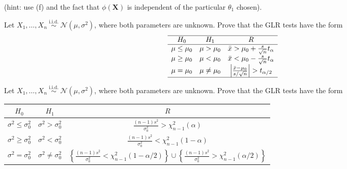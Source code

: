 \begin{ex}
\begin{enumerate}[(a)]
        (hint: use (f) and the fact that \(\phi(\mathbf{X})\) is independent of the particular \(\theta_{1}\) chosen). 
    \end{enumerate}
\end{ex}


\begin{ex}
    Let \(X_{1}, \ldots, X_{n} \stackrel{\text { i.i.d. }}{\sim} \mathcal{N}\left(\mu, \sigma^{2}\right)\), where both parameters are unknown. Prove that the GLR tests have the form
    \[
        \begin{array}{ccc}
        \hline H_{0} & H_{1} & R \\
        \hline \mu \leq \mu_{0} & \mu>\mu_{0} & \bar{x}>\mu_{0}+\frac{s}{\sqrt{n}} t_{\alpha} \\
        \mu \geq \mu_{0} & \mu<\mu_{0} & \bar{x}<\mu_{0}-\frac{s}{\sqrt{n}} t_{\alpha} \\
        \mu=\mu_{0} & \mu \neq \mu_{0} & \left|\frac{\bar{x}-\mu_{0}}{s / \sqrt{n}}\right|>t_{\alpha / 2} \\
        \hline
        \end{array}
    \]
\end{ex}

\begin{ex}
    Let \(X_{1}, \ldots, X_{n} \stackrel{\text { i.i.d. }}{\sim} \mathcal{N}\left(\mu, \sigma^{2}\right)\), where both parameters are unknown. Prove that the GLR tests have the form
    \begin{center}
        \begin{tabular}{ccc}
            \hline\(H_{0}\) & \(H_{1}\) & \(R\) \\
            \hline\(\sigma^{2} \leq \sigma_{0}^{2}\) & \(\sigma^{2}>\sigma_{0}^{2}\) & \(\frac{(n-1) s^{2}}{\sigma_{0}^{2}}>\chi_{n-1}^{2}(\alpha)\) \\
            \(\sigma^{2} \geq \sigma_{0}^{2}\) & \(\sigma^{2}<\sigma_{0}^{2}\) & \(\frac{(n-1) s^{2}}{\sigma_{0}^{2}}<\chi_{n-1}^{2}(1-\alpha)\) \\
            \(\sigma^{2}=\sigma_{0}^{2}\) & \(\sigma^{2} \neq \sigma_{0}^{2}\) & \(\left\{\frac{(n-1) s^{2}}{\sigma_{0}^{2}}<\chi_{n-1}^{2}(1-\alpha / 2)\right\} \cup\left\{\frac{(n-1) s^{2}}{\sigma_{0}^{2}}>\chi_{n-1}^{2}(\alpha / 2)\right\}\) \\
            \hline
        \end{tabular}
    \end{center}
\end{ex}

